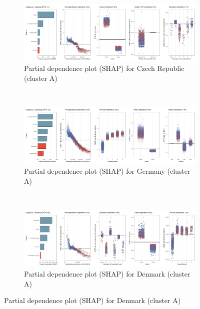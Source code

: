\begin{figure}[ht!]\ContinuedFloat
    \centering
   \begin{subfigure}[b]{\textwidth}
          \centering
         \caption{Partial dependence plot (SHAP) for Czech Republic (cluster A)}
         \label{fig:5b_CZE}
         \includegraphics[width=\textwidth]{Figure 5b/Figure_5b_CZE}    \end{subfigure}
    \\
    \vspace{0.5cm}
   \begin{subfigure}[b]{\textwidth}
         \centering
         \caption{Partial dependence plot (SHAP) for Germany (cluster A)}
         \label{fig:5b_DEU}
         \includegraphics[width=\textwidth]{Figure 5b/Figure_5b_DEU}
         \end{subfigure}
    \\
    \vspace{0.5cm}
   \begin{subfigure}[b]{\textwidth}
         \centering
         \caption{Partial dependence plot (SHAP) for Denmark (cluster A)}
         \label{fig:5b_DNK}
         \includegraphics[width=\textwidth]{Figure 5b/Figure_5b_DNK} \end{subfigure}

\end{figure}
